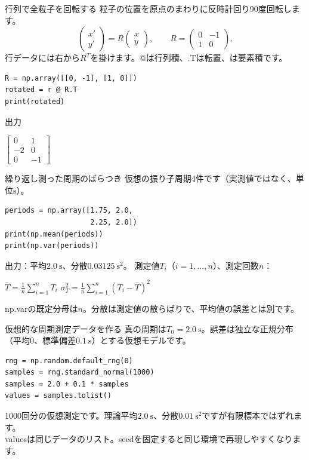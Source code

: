 \documentclass[12pt,aspectratio=43]{beamer}
\newcommand{\code}[1]{{\codefont #1}}
\begin{document}
\begin{frame}[t,fragile]{行列で全粒子を回転する}
  \setlength{\parskip}{0pt}
  粒子の位置を原点のまわりに反時計回り90度回転します。
  \[\begin{pmatrix}x'\\y'\end{pmatrix}=
    R\begin{pmatrix}x\\y\end{pmatrix},\qquad
    R=\begin{pmatrix}0&-1\\1&0\end{pmatrix}.\]
  \small 行データには右から\(R^T\)を掛けます。\code{@}は行列積、\code{.T}は転置、\code{*}は要素積です。
\begin{lstlisting}
R = np.array([[0, -1], [1, 0]])
rotated = r @ R.T
print(rotated)
\end{lstlisting}
  {\small\textcolor{black!60}{出力}}\quad
  {\codefont\fontsize{12}{14}\selectfont \(\begin{bmatrix}0&1\\-2&0\\0&-1\end{bmatrix}\)\par}
\end{frame}

\begin{frame}[t,fragile]{繰り返し測った周期のばらつき}
  \setlength{\parskip}{0pt}
  \small 仮想の振り子周期4件です（実測値ではなく、単位\(\mathrm{s}\)）。
\begin{lstlisting}
periods = np.array([1.75, 2.0,
                    2.25, 2.0])
print(np.mean(periods))
print(np.var(periods))
\end{lstlisting}
  {\small 出力：平均\(2.0\ \mathrm{s}\)、分散\(0.03125\ \mathrm{s^2}\)。}
  {\small 測定値\(T_i\)（\(i=1,\ldots,n\)）、測定回数\(n\)：}
  {\footnotesize
    \(\bar{T}=\frac{1}{n}\sum_{i=1}^{n}T_i\)\qquad
    \(\sigma_T^2=\frac{1}{n}\sum_{i=1}^{n}(T_i-\bar{T})^2\)\par}
  \par\vspace{1mm}
  {\small \code{np.var}の既定分母は\(n\)。分散は測定値の散らばりで、平均値の誤差とは別です。}
\end{frame}

\begin{frame}[t,fragile]{仮想的な周期測定データを作る}
  \setlength{\parskip}{0pt}
  真の周期は\(T_0=2.0\ \mathrm{s}\)。誤差は独立な正規分布（平均0、標準偏差\(0.1\ \mathrm{s}\)）とする仮想モデルです。
\begin{lstlisting}[aboveskip=1mm,belowskip=0mm]
rng = np.random.default_rng(0)
samples = rng.standard_normal(1000)
samples = 2.0 + 0.1 * samples
values = samples.tolist()
\end{lstlisting}
  {\small 1000回分の仮想測定です。理論平均\(2.0\ \mathrm{s}\)、分散\(0.01\ \mathrm{s^2}\)ですが有限標本ではずれます。\\
    \code{values}は同じデータのリスト。seedを固定すると同じ環境で再現しやすくなります。}
\end{frame}
\end{document}
